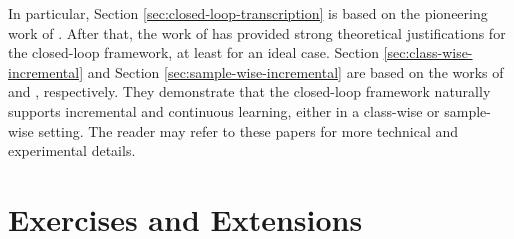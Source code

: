 \documentclass[../../book-main.tex]{subfiles}
\begin{document}
In particular, Section \ref{sec:closed-loop-transcription} is based on the pioneering work of \cite{Dai-entropy-2022}. After that, the work of \cite{pai2022pursuit} has provided strong theoretical justifications for the closed-loop framework, at least for an ideal case. Section \ref{sec:class-wise-incremental} and Section \ref{sec:sample-wise-incremental} are based on the works of \cite{tong2023incremental} and \cite{pmlr-v234-tong24a}, respectively. They demonstrate that the closed-loop framework naturally supports incremental and continuous learning, either in a class-wise or sample-wise setting. The reader may refer to these papers for more technical and experimental details.

\section{Exercises and Extensions}
\end{document}
